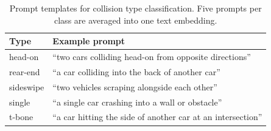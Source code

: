 \begin{table}[t]
\centering
\small
\caption{Prompt templates for collision type classification. Five prompts per class are averaged into one text embedding.}
\label{tab:prompts}
\begin{tabular}{@{}ll@{}}
\toprule
\textbf{Type} & \textbf{Example prompt} \\
\midrule
head-on   & ``two cars colliding head-on from opposite directions'' \\
rear-end  & ``a car colliding into the back of another car'' \\
sideswipe & ``two vehicles scraping alongside each other'' \\
single    & ``a single car crashing into a wall or obstacle'' \\
t-bone    & ``a car hitting the side of another car at an intersection'' \\
\bottomrule
\end{tabular}
\end{table}
